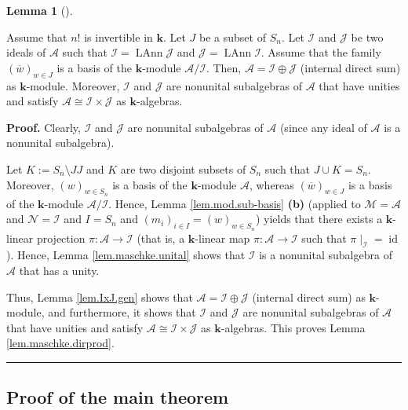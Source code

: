 \documentclass[numbers=enddot,12pt,final,onecolumn,notitlepage]{scrartcl}%
\numberwithin{exer}{subsection}
\theoremstyle{definition}
\newtheorem{lem}[theo]{Lemma}
\newenvironment{lemma}[1][]
{\begin{lem}[#1]\begin{leftbar}}
{\end{leftbar}\end{lem}}
\newenvironment{proof}[1][Proof]{\noindent\textbf{#1.} }{\ \rule{0.5em}{0.5em}}
\begin{document}
\begin{lemma}
\label{lem.maschke.dirprod}Assume that $n!$ is invertible in $\mathbf{k}$. Let
$J$ be a subset of $S_{n}$. Let $\mathcal{I}$ and $\mathcal{J}$ be two ideals
of $\mathcal{A}$ such that $\mathcal{I}=\operatorname*{LAnn}\mathcal{J}$ and
$\mathcal{J}=\operatorname*{LAnn}\mathcal{I}$. Assume that the family $\left(
\overline{w}\right)  _{w\in J}$ is a basis of the $\mathbf{k}$-module
$\mathcal{A}/\mathcal{I}$. Then, $\mathcal{A}=\mathcal{I}\oplus\mathcal{J}$
(internal direct sum) as $\mathbf{k}$-module. Moreover, $\mathcal{I}$ and
$\mathcal{J}$ are nonunital subalgebras of $\mathcal{A}$ that have unities and
satisfy $\mathcal{A}\cong\mathcal{I}\times\mathcal{J}$ as $\mathbf{k}$-algebras.
\end{lemma}

\begin{proof}
Clearly, $\mathcal{I}$ and $\mathcal{J}$ are nonunital subalgebras of
$\mathcal{A}$ (since any ideal of $\mathcal{A}$ is a nonunital subalgebra).

Let $K:=S_{n}\setminus J$$J$ and $K$ are two disjoint subsets
of $S_{n}$ such that $J\cup K=S_{n}$. Moreover, $\left(  w\right)  _{w\in
S_{n}}$ is a basis of the $\mathbf{k}$-module $\mathcal{A}$, whereas $\left(
\overline{w}\right)  _{w\in J}$ is a basis of the $\mathbf{k}$-module
$\mathcal{A}/\mathcal{I}$. Hence, Lemma \ref{lem.mod.sub-basis} \textbf{(b)}
(applied to $\mathcal{M}=\mathcal{A}$ and $\mathcal{N}=\mathcal{I}$ and
$I=S_{n}$ and $\left(  m_{i}\right)  _{i\in I}=\left(  w\right)  _{w\in S_{n}%
}$) yields that there exists a $\mathbf{k}$-linear projection $\pi
:\mathcal{A}\rightarrow\mathcal{I}$ (that is, a $\mathbf{k}$-linear map
$\pi:\mathcal{A}\rightarrow\mathcal{I}$ such that $\left.  \pi\mid
_{\mathcal{I}}\right.  =\operatorname*{id}$). Hence, Lemma
\ref{lem.maschke.unital} shows that $\mathcal{I}$ is a nonunital subalgebra of
$\mathcal{A}$ that has a unity.

Thus, Lemma \ref{lem.IxJ.gen} shows that $\mathcal{A}=\mathcal{I}%
\oplus\mathcal{J}$ (internal direct sum) as $\mathbf{k}$-module, and
furthermore, it shows that $\mathcal{I}$ and $\mathcal{J}$ are nonunital
subalgebras of $\mathcal{A}$ that have unities and satisfy $\mathcal{A}%
\cong\mathcal{I}\times\mathcal{J}$ as $\mathbf{k}$-algebras. This proves Lemma
\ref{lem.maschke.dirprod}.
\end{proof}

\subsection{\label{sec.row.main-proof}Proof of the main theorem}
\end{document}
